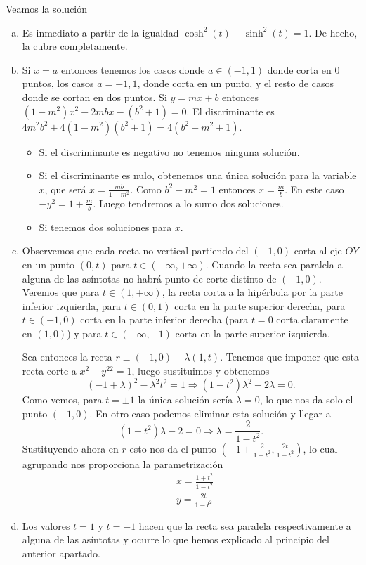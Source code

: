 \documentclass[twoside]{article}
\begin{document}
\begin{solucion}
Veamos la solución
\begin{enumerate}[a)]
\item Es inmediato a partir de la igualdad $\cosh^2(t)
-\sinh^2(t)=1$. De hecho, la cubre completamente.
\item Si $x=a$ entonces tenemos los casos donde $a\in(-1,1)$ donde corta en 0 puntos, los casos $a=-1,1$, donde corta en un punto, y el resto de casos donde se cortan en dos puntos. Si $y=mx+b$ entonces $(1-m^2)x^2-2mbx-(b^2+1)=0$. El discriminante es $4m^2b^2+4(1-m^2)(b^2+1) = 4(b^2-m^2+1)$. 
\begin{itemize}
\item Si el discriminante es negativo no tenemos ninguna solución.
\item Si el discriminante es nulo, obtenemos una única solución para la variable $x$, que será $x=\frac{mb}{1-m^2}$. Como $b^2-m^2 =1$ entonces $x= \frac{m}{b}$. En este caso $-y^2 = 1 + \frac{m}{b}$. Luego tendremos a lo sumo dos soluciones.
\item Si tenemos dos soluciones para $x$.  
\end{itemize}
\item Observemos que cada recta no vertical partiendo del $(-1,0)$ corta al eje $OY$ en un punto $(0,t)$ para $t\in(-\infty,+\infty)$. Cuando la recta sea paralela a alguna de las asíntotas no habrá punto de corte distinto de $(-1,0)$. Veremos que para $t\in(1,+\infty)$, la recta corta a la hipérbola por la parte inferior izquierda, para $t\in(0,1)$ corta en la parte superior derecha, para $t\in (-1,0)$ corta en la parte inferior derecha (para $t=0$ corta claramente en $(1,0)$) y para $t\in (-\infty,-1)$ corta en la parte superior izquierda.

Sea entonces la recta $r\equiv (-1,0)+\lambda (1,t)$. Tenemos que imponer que esta recta corte a $x^2-y^22=1$, luego sustituimos y obtenemos
\[
(-1+\lambda)^2-\lambda^2t^2=1\Rightarrow (1-t^2)\lambda^2-2\lambda=0.
\]
Como vemos, para $t=\pm 1$ la única solución sería $\lambda=0$, lo que nos da solo el punto $(-1,0)$. En otro caso podemos eliminar esta solución y llegar a 
\[
(1-t^2)\lambda-2=0\Rightarrow \lambda= \frac{2}{1-t^2}.
\]
Sustituyendo ahora en $r$ esto nos da el punto $(-1+\frac{2}{1-t^2}, \frac{2t}{1-t^2})$, lo cual agrupando nos proporciona la parametrización
\begin{align*}
&x=\frac{1+t^2}{1-t^2}\\
&y= \frac{2t}{1-t^2}
\end{align*}
\item Los valores $t=1$ y $t=-1$ hacen que la recta sea paralela respectivamente a alguna de las asíntotas y ocurre lo que hemos explicado al principio del anterior apartado.
\end{enumerate}
\end{solucion}
\end{document}
